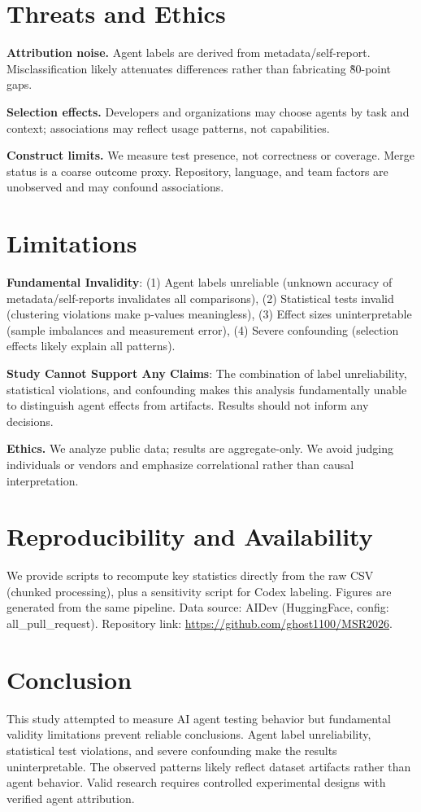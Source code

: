 \documentclass[conference]{IEEEtran}
\begin{document}
\section{Threats and Ethics}
\textbf{Attribution noise.} Agent labels are derived from metadata/self-report. Misclassification likely attenuates differences rather than fabricating \~80-point gaps.

\textbf{Selection effects.} Developers and organizations may choose agents by task and context; associations may reflect usage patterns, not capabilities.

\textbf{Construct limits.} We measure test presence, not correctness or coverage. Merge status is a coarse outcome proxy. Repository, language, and team factors are unobserved and may confound associations.\section{Limitations}
\textbf{Fundamental Invalidity}: (1) Agent labels unreliable (unknown accuracy of metadata/self-reports invalidates all comparisons), (2) Statistical tests invalid (clustering violations make p-values meaningless), (3) Effect sizes uninterpretable (sample imbalances and measurement error), (4) Severe confounding (selection effects likely explain all patterns).

\textbf{Study Cannot Support Any Claims}: The combination of label unreliability, statistical violations, and confounding makes this analysis fundamentally unable to distinguish agent effects from artifacts. Results should not inform any decisions.

\textbf{Ethics.} We analyze public data; results are aggregate-only. We avoid judging individuals or vendors and emphasize correlational rather than causal interpretation.

\section{Reproducibility and Availability}
We provide scripts to recompute key statistics directly from the raw CSV (chunked processing), plus a sensitivity script for Codex labeling. Figures are generated from the same pipeline. Data source: AIDev (HuggingFace, config: all\_pull\_request). Repository link: \url{https://github.com/ghost1100/MSR2026}.

\section{Conclusion}
This study attempted to measure AI agent testing behavior but fundamental validity limitations prevent reliable conclusions. Agent label unreliability, statistical test violations, and severe confounding make the results uninterpretable. The observed patterns likely reflect dataset artifacts rather than agent behavior. Valid research requires controlled experimental designs with verified agent attribution.
\end{document}
